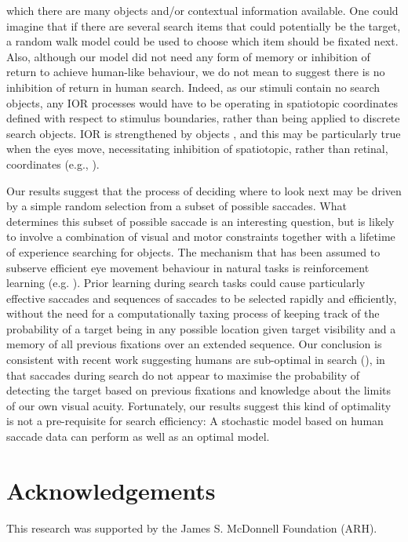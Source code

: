 \documentclass[preprint, authoryear]{elsarticle} %
\begin{document}
which there are many objects and/or contextual information available. One
could imagine that if there are several search items that could potentially be
the target, a random walk model could be used to choose which item should be
fixated next. Also, although our model did not need any form of memory or
inhibition of return to achieve human-like behaviour, we do not mean to
suggest there is no inhibition of return in human search. Indeed, as our
stimuli contain no search objects, any IOR processes would have to be
operating in spatiotopic coordinates defined with respect to stimulus
boundaries, rather than being applied to discrete search objects. IOR is
strengthened by objects \citep{jordan1998}, and this may be particularly true
when the eyes move, necessitating inhibition of spatiotopic, rather than
retinal, coordinates (e.g., \cite{kruger2013}).

\par

Our results suggest that the process of deciding where to look next may be driven by a simple random selection from a subset of possible saccades. What determines this subset of possible saccade is an interesting question, but is likely to involve a combination of visual and motor constraints together with a lifetime of experience searching for objects. The mechanism that has been assumed to subserve efficient eye movement behaviour in natural tasks is reinforcement learning (e.g. \cite{hayhoe2014}). Prior learning during search tasks could cause particularly effective saccades and sequences of saccades to be selected rapidly and efficiently, without the need for a computationally taxing process of keeping track of the probability of a target being in any possible location given target visibility and a memory of all previous fixations over an extended sequence. Our conclusion is consistent with recent work suggesting humans are sub-optimal in search (\cite{morvan2012, verghese2012, zhang2012}), in that saccades during search do not appear to maximise the probability of detecting the target based on previous fixations and knowledge about the limits of our own visual acuity. Fortunately, our results suggest this kind of optimality is not a pre-requisite for search efficiency: A stochastic model based on human saccade data can perform as well as an optimal model.

\section*{Acknowledgements}
This research was supported by the James S. McDonnell Foundation (ARH).




\end{document}
